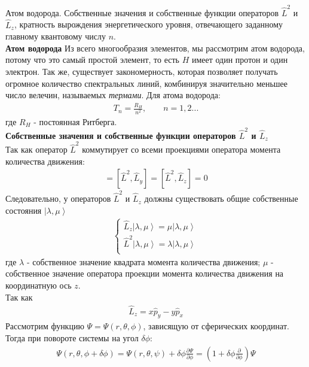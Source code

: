 \documentclass[__main__.tex]{subfiles}
\begin{document}
Атом водорода. Собственные значения и собственные функции операторов $\hat{L}^2$ и $\hat{L}_z$, кратность вырождения энергетического уровня, отвечающего заданному главному квантовому числу $n$.\\ 

\textbf{Атом водорода}
Из всего многообразия элементов, мы рассмотрим атом водорода, потому что это самый простой элемент, то есть $H$ имеет один протон и один электрон. Так же, существует закономерность, которая позволяет получать огромное количество спектральных линий, комбинируя значительно меньшее число велечин, называемых \textit{термами}. Для атома водорода:\\
\begin{gather}
T_n = \frac{R_H}{n^2}, \qquad n=1,2...
\end{gather}
где $R_H$ - постоянная Ритберга.\\
\textbf{Собственные значения и собственные функции операторов $\hat{L}^2$ и $\hat{L}_z$}\\
Так как оператор $\hat{L}^2$ коммутирует со всеми проекциями оператора момента количества движения:
\begin{gather}
[\hat{L}^2,\hat{L}_x] = [\hat{L}^2,\hat{L}_y] = [\hat{L}^2,\hat{L}_z] = 0
\end{gather}
Следовательно, у операторов $\hat{L}^2$ и $\hat{L}_z$ должны существовать общие собственные состояния $\left|\lambda,\mu\right>$
\begin{gather}
\begin{cases}
\hat{L}_z \left|\lambda,\mu\right> = \mu\left|\lambda,\mu\right>\\
\hat{L}^2 \left|\lambda,\mu\right> = \lambda\left|\lambda,\mu\right>\\
\end{cases}
\end{gather}
где $\lambda$ - собственное значение квадрата момента количества движения; $\mu$ - собственное значение оператора проекции момента количества движения на координатную ось $z$.\\
Так как
\begin{gather}
\hat{L}_z = x\hat{p}_y-y\hat{p}_x
\end{gather}
Рассмотрим функцию $\Psi = \Psi(r,\theta,\phi)$, зависящую от сферических координат. Тогда при повороте системы на угол $\delta \phi$:
\begin{gather}
\Psi(r,\theta,\phi+\delta\phi) = \Psi(r,\theta,\psi)+\delta \phi \frac{\partial \Psi}{\partial \phi} = \left(1+\delta \phi \frac{\partial}{\partial \phi}\right) \Psi
\end{gather}
\end{document}
